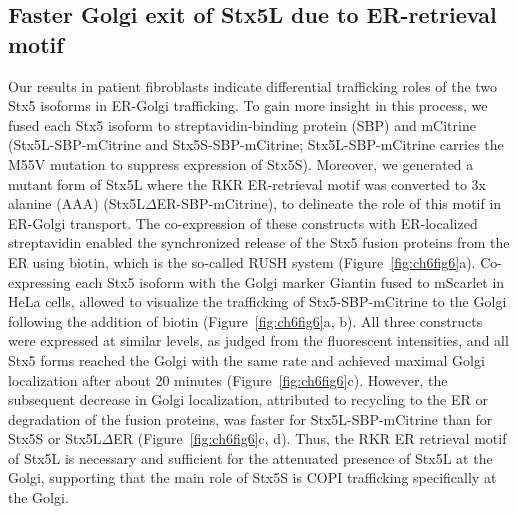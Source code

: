 \subsection{Faster Golgi exit of Stx5L due to ER-retrieval motif}

Our results in patient fibroblasts indicate differential trafficking roles of the two Stx5 isoforms in ER-Golgi trafficking. To gain more insight in this process, we fused each Stx5 isoform to streptavidin-binding protein (SBP) and mCitrine (Stx5L-SBP-mCitrine and Stx5S-SBP-mCitrine; Stx5L-SBP-mCitrine carries the M55V mutation to suppress expression of Stx5S). Moreover, we generated a mutant form of Stx5L where the RKR ER-retrieval motif was converted to 3x alanine (AAA) (Stx5L$\Delta$ER-SBP-mCitrine)\cite{hui_isoform_1997}, to delineate the role of this motif in ER-Golgi transport. The co-expression of these constructs with ER-localized streptavidin enabled the synchronized release of the Stx5 fusion proteins from the ER using biotin, which is the so-called RUSH system\cite{boncompain_synchronization_2012} (Figure~\ref{fig:ch6fig6}a). Co-expressing each Stx5 isoform with the Golgi marker Giantin fused to mScarlet\cite{bindels_mscarlet:_2017} in HeLa cells, allowed to visualize the trafficking of Stx5-SBP-mCitrine to the Golgi following the addition of biotin (Figure~\ref{fig:ch6fig6}a, b). All three constructs were expressed at similar levels, as judged from the fluorescent intensities, and all Stx5 forms reached the Golgi with the same rate and achieved maximal Golgi localization after about 20 minutes (Figure~\ref{fig:ch6fig6}c). However, the subsequent decrease in Golgi localization, attributed to recycling to the ER or degradation of the fusion proteins, was faster for Stx5L-SBP-mCitrine than for Stx5S or Stx5L$\Delta$ER (Figure~\ref{fig:ch6fig6}c, d). Thus, the RKR ER retrieval motif of Stx5L is necessary and sufficient for the attenuated presence of Stx5L at the Golgi, supporting that the main role of Stx5S is COPI trafficking specifically at the Golgi.

